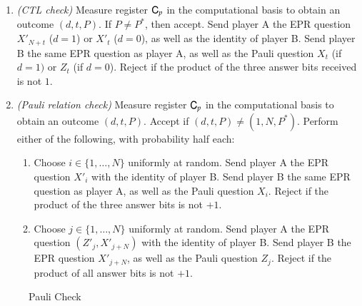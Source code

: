 \begin{center}
\begin{mdframed}
\begin{enumerate}
\item \emph{(CTL check)} Measure register ${\textsf{C}}_{p}$ in the computational basis to obtain an outcome $(d,t,P)$. If $P \neq P^*$, then accept. Send player A the EPR question $X'_{N+t}$ ($d=1$) or $X'_t$ ($d=0$), as well as the identity of player B.  Send player B the same EPR question as player A, as well as the Pauli question $X_t$ (if $d=1)$ or $Z_t$ (if $d=0$).  Reject if the product of the three answer bits received is not $1$.

\item{\emph{(Pauli relation check)}} Measure register ${\textsf{C}}_p$  in the computational basis to obtain an outcome $(d,t,P)$. Accept if $(d,t,P)\neq (1,N,P^*)$. Perform either of the following, with probability half each:
\begin{enumerate}
\item Choose $i\in\{1,\ldots,N\}$ uniformly at random. Send player A the EPR question $X'_i$ with the identity of player B. Send player B the same EPR question as player A, as well as the Pauli question $X_i$. Reject if the product of the three answer bits is not $+1$. 
\item Choose $j\in\{1,\ldots,N\}$ uniformly at random. Send player A the EPR question $(Z'_j,X'_{j+N})$  with the identity of player B. Send player B the EPR question $X'_{j+N}$, as well as the Pauli question $Z_j$. Reject if the product of all answer bits is not $+1$. 
\end{enumerate}
	\end{enumerate}    
\end{mdframed}
\end{center}
\begin{figure}[H]
\caption{Pauli Check}
\label{fig:pauli_check}
\end{figure}


